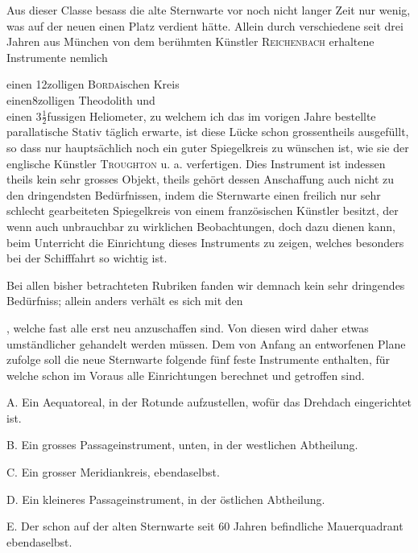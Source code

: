  Aus dieser Classe besass die alte Sternwarte vor noch nicht langer Zeit nur wenig, was auf der neuen einen Platz verdient hätte. Allein durch verschiedene seit drei Jahren aus München von dem berühmten Künstler \textsc{Reichenbach} erhaltene Instrumente nemlich\par
\noindent\hspace*{\parindent}einen 12zolligen \textsc{Borda}ischen Kreis\\
\hspace*{\parindent}einen\enspace 8zolligen Theodolith und\\
\hspace*{\parindent}einen $3\frac12$fussigen Heliometer, zu welchem ich das im vorigen Jahre bestellte parallatische Stativ täglich erwarte, ist diese Lücke schon grossentheils ausgefüllt, so dass nur hauptsächlich noch ein guter Spiegelkreis zu wünschen ist, wie sie der englische Künstler \textsc{Troughton} u. a. verfertigen. Dies Instrument ist indessen theils kein sehr grosses Objekt, theils gehört dessen Anschaffung auch nicht zu den dringendsten Bedürfnissen, indem die Sternwarte einen freilich nur sehr schlecht gearbeiteten Spiegelkreis von einem französischen Künstler besitzt, der wenn auch unbrauchbar zu wirklichen Beobachtungen, doch dazu dienen kann, beim Unterricht die Einrichtung dieses Instruments zu zeigen, welches besonders bei der Schifffahrt so wichtig ist.

Bei allen bisher betrachteten Rubriken fanden wir demnach kein sehr dringendes Bedürfniss; allein anders verhält es sich mit den\par
\noindent\hspace*{\parindent}, welche fast alle erst neu anzuschaffen sind. Von diesen wird daher etwas umständlicher gehandelt werden müssen.
\clearpage{}
Dem von Anfang an entworfenen Plane zufolge soll die neue Sternwarte folgende fünf feste Instrumente enthalten, für welche schon im Voraus alle Einrichtungen berechnet und getroffen sind.\par
\noindent\hspace*{\parindent}A. Ein Aequatoreal, in der Rotunde aufzustellen, wofür das Drehdach eingerichtet ist.\par
\noindent\hspace*{\parindent}B. Ein grosses Passageinstrument, unten, in der westlichen Abtheilung.\par
\noindent\hspace*{\parindent}C. Ein grosser Meridiankreis, ebendaselbst.\par
\noindent\hspace*{\parindent}D. Ein kleineres Passageinstrument, in der östlichen Abtheilung.\par
\noindent\hspace*{\parindent}E. Der schon auf der alten Sternwarte seit 60 Jahren befindliche Mauerquadrant ebendaselbst.

